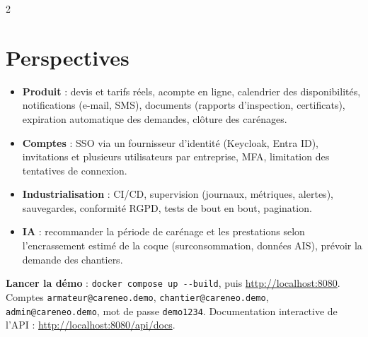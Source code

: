 \documentclass[10pt,a4paper]{article}
\newcommand{\code}[1]{\texttt{\small #1}}
\begin{document}
\begin{multicols}{2}
\section{Perspectives}
\begin{itemize}
  \item \textbf{Produit} : devis et tarifs réels, acompte en ligne, calendrier des disponibilités, notifications (e-mail, SMS), documents (rapports d'inspection, certificats), expiration automatique des demandes, clôture des carénages.
  \item \textbf{Comptes} : SSO via un fournisseur d'identité (Keycloak, Entra ID), invitations et plusieurs utilisateurs par entreprise, MFA, limitation des tentatives de connexion.
  \item \textbf{Industrialisation} : CI/CD, supervision (journaux, métriques, alertes), sauvegardes, conformité RGPD, tests de bout en bout, pagination.
  \item \textbf{IA} : recommander la période de carénage et les prestations selon l'encrassement estimé de la coque (surconsommation, données AIS), prévoir la demande des chantiers.
\end{itemize}
\end{multicols}

\vfill
\noindent\colorbox{soft}{\parbox{\dimexpr\linewidth-2\fboxsep}{\small\raggedright
\textbf{\color{brand}Lancer la démo} : \code{docker compose up -{}-build}, puis \url{http://localhost:8080}.
Comptes \code{armateur@careneo.demo}, \code{chantier@careneo.demo}, \code{admin@careneo.demo},
mot de passe \code{demo1234}. Documentation interactive de l'API : \url{http://localhost:8080/api/docs}.}}
\end{document}
